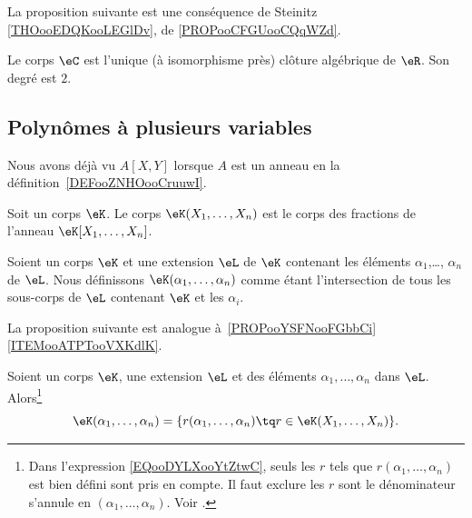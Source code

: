 La proposition suivante est une conséquence de Steinitz \ref{THOooEDQKooLEGlDv}, de \ref{PROPooCFGUooCQqWZd}.
\begin{proposition}	\label{PROPooZWVPooStuTAO}
	Le corps \( \eC\) est l'unique (à isomorphisme près) clôture algébrique de \( \eR\). Son degré est \( 2\).
\end{proposition}


\subsection{Polynômes à plusieurs variables}

Nous avons déjà vu \( A[X,Y]\) lorsque \( A\) est un anneau en la définition~\ref{DEFooZNHOooCruuwI}.

\begin{definition}      \label{DEFooRHRKooPqLNOp}
	Soit un corps \( \eK\). Le corps \( \eK(X_1,\ldots, X_n)\) est le corps des fractions de l'anneau \( \eK[X_1,\ldots, X_n]\).
\end{definition}

\begin{definition}  \label{DEFooOCPHooXneutp}
	Soient un corps \( \eK\) et une extension \( \eL\) de \( \eK\) contenant les éléments \( \alpha_1\),\ldots, \( \alpha_n\) de \( \eL\). Nous définissons \( \eK(\alpha_1,\ldots, \alpha_n)\) comme étant l'intersection de tous les sous-corps de \( \eL\) contenant \( \eK\) et les \( \alpha_i\).
\end{definition}

La proposition suivante est analogue à~\ref{PROPooYSFNooFGbbCi}\ref{ITEMooATPTooVXKdlK}.

\begin{lemma}        \label{LEMooQEJHooAmSNxU}
	Soient un corps \( \eK\), une extension \( \eL\) et des éléments \( \alpha_1,\ldots, \alpha_n\) dans \( \eL\). Alors\footnote{Dans l'expression \eqref{EQooDYLXooYtZtwC}, seuls les \( r\) tels que \( r(\alpha_1,\ldots,\alpha_n)\) est bien défini sont pris en compte. Il faut exclure les \( r\) sont le dénominateur s'annule en \( (\alpha_1,\ldots,\alpha_n)\). Voir \cite{BIBooPEDGooCQRqcV}.}
	\begin{equation}		\label{EQooDYLXooYtZtwC}
		\eK(\alpha_1,\ldots, \alpha_n)=\{ r(\alpha_1,\ldots, \alpha_n)\tq r\in \eK(X_1,\ldots, X_n) \}.
	\end{equation}
\end{lemma}

